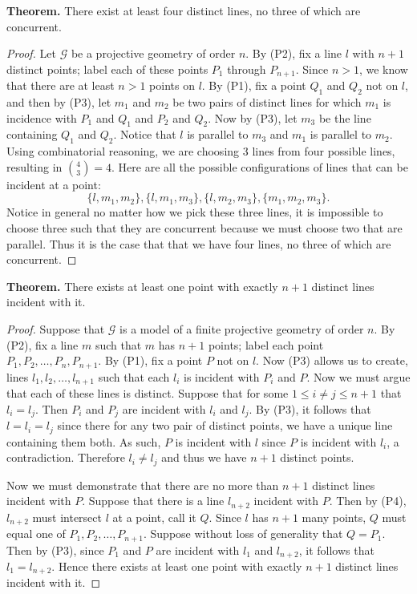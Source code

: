 \documentclass[12pt]{book}
\def\cG{{\mathcal{G}}}
\def\header #1{\noindent\textbf{#1}}
\begin{document}
\header{Theorem.} There exist at least four distinct lines, no three of which are concurrent.
\begin{proof}
Let $\cG$ be a projective geometry of order $n$. By (P2), fix a line $l$ with $n+1$ distinct points; label each of these points $P_1$ through $P_{n+1}$. Since $n>1$, we know that there are at least $n>1$ points on $l$. By (P1), fix a point $Q_1$ and $Q_2$ not on $l$, and then by (P3), let $m_1$ and $m_2$ be two pairs of distinct lines for which $m_1$ is incidence with $P_1$ and $Q_1$ and $P_2$ and $Q_2$. Now by (P3), let $m_3$ be the line containing $Q_1$ and $Q_2$. Notice that $l$ is parallel to $m_3$ and $m_1$ is parallel to $m_2$. Using combinatorial reasoning, we are choosing 3 lines from four possible lines, resulting in $\binom{4}{3}=4$. Here are all the possible configurations of lines that can be incident at a point:
\[\{l,m_1,m_2\}, \{l,m_1,m_3\}, \{l,m_2,m_3\}, \{m_1,m_2,m_3\}.\]
Notice in general no matter how we pick these three lines, it is impossible to choose three such that they are concurrent because we must choose two that are parallel. Thus it is the case that that we have four lines, no three of which are concurrent. 
\end{proof}

\header{Theorem.} There exists at least one point with exactly $n+1$ distinct lines incident with it.

\begin{proof}
Suppose that $\cG$ is a model of a finite projective geometry of order $n$. By (P2), fix a line $m$ such that $m$ has $n+1$ points; label each point $P_1,P_2,\ldots,P_n,P_{n+1}$. By (P1), fix a point $P$ not on $l$. Now (P3) allows us to create, lines $l_1,l_2,\ldots,l_{n+1}$ such that each $l_i$ is incident with $P_i$ and $P$. Now we must argue that each of these lines is distinct. Suppose that for some $1\leq i\neq j\leq n+1$ that $l_i=l_j$. Then $P_i$ and $P_j$ are incident with $l_i$ and $l_j$. By (P3), it follows that $l=l_i=l_j$ since there for any two pair of distinct points, we have a unique line containing them both. As such, $P$ is incident with $l$ since $P$ is incident with $l_i$, a contradiction. Therefore $l_i\neq l_j$ and thus we have $n+1$ distinct points. 

Now we must demonstrate that there are no more than $n+1$ distinct lines incident with $P$. Suppose that there is a line $l_{n+2}$ incident with $P$. Then by (P4), $l_{n+2}$ must intersect $l$ at a point, call it $Q$. Since $l$ has $n+1$ many points, $Q$ must equal one of $P_1,P_2,\ldots,P_{n+1}$. Suppose without loss of generality that $Q=P_1$. Then by (P3), since $P_1$ and $P$ are incident with $l_1$ and $l_{n+2}$, it follows that $l_1=l_{n+2}$. Hence there exists at least one point with exactly $n+1$ distinct lines incident with it.
\end{proof}
\end{document}
